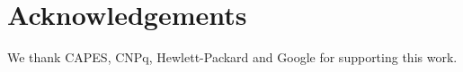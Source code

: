 \section*{Acknowledgements}
\label{sec:ack}

We thank CAPES, CNPq, Hewlett-Packard and Google for supporting this work.
